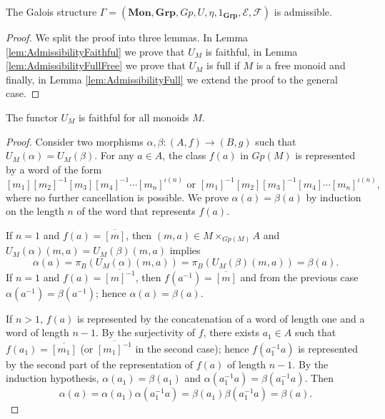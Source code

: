 \begin{proposition}
\label{prop:AdmissibilityMonoids}
    The Galois structure $\Gamma = (\textbf{Mon}, \textbf{Grp}, Gp, U, \eta, 1_{\textbf{Grp}}, \mathscr{E}, \mathscr{F})$ is admissible.
    \begin{proof}
        We split the proof into three lemmas. In Lemma \ref{lem:AdmissibilityFaithful} we prove that $U_M$ is faithful, in Lemma \ref{lem:AdmissibilityFullFree} we prove that $U_M$ is full if $M$ is a free monoid and finally, in Lemma \ref{lem:AdmissibilityFull} we extend the proof to the general case.
    \end{proof}
\end{proposition}
\begin{lemma}
\label{lem:AdmissibilityFaithful}
    The functor $U_M$ is faithful for all monoids $M$.
    \begin{proof}
        Consider two morphisms $\alpha,\beta:(A,f)\rightarrow (B,g)$ such that $U_M(\alpha) = U_M(\beta)$. For any $a \in A$, the class $f(a)$ in $Gp(M)$ is represented by a word of the form
        \[ [m_1][m_2]^{-1}[m_3][m_4]^{-1}\cdots[m_n]^{\iota(n)}\text{ or } [m_1]^{-1}[m_2][m_3]^{-1}[m_4]\cdots[m_n]^{\iota(n)}, \]
        where no further cancellation is possible. We prove $\alpha(a) = \beta(a)$ by induction on the length $n$ of the word that represents $f(a)$.

        If $n=1$ and $f(a) =\overline{[m]}$, then $(m,a)\in M\times_{Gp(M)}A$ and $U_M(\alpha)(m,a) = U_M(\beta)(m,a)$ implies
        \[ \alpha(a) = \pi_B(U_M(\alpha)(m,a)) = \pi_B(U_M(\beta)(m,a)) = \beta(a). \]
        If $n=1$ and $f(a) = \overline{[m]^{-1}}$, then $f(a^{-1})=\overline{[m]}$ and from the previous case $\alpha(a^{-1}) = \beta(a^{-1})$; hence $\alpha(a) = \beta(a)$.

        If $n>1$, $f(a)$ is represented by the concatenation of a word of length one and a word of length $n-1$. By the surjectivity of $f$, there exists $a_1\in A$ such that $f(a_1)=\overline{[m_1]}$ (or $\overline{[m_1]^{-1}}$ in the second case); hence $f(a_1^{-1}a)$ is represented by the second part of the representation of $f(a)$ of length $n-1$. By the induction hypothesis, $\alpha(a_1) = \beta(a_1)$ and $\alpha(a_1^{-1}a) = \beta(a_1^{-1}a)$. Then
        \[ \alpha(a) = \alpha(a_1)\alpha(a_1^{-1}a) = \beta(a_1)\beta(a_1^{-1}a) = \beta(a). \]
    \end{proof}
\end{lemma}
